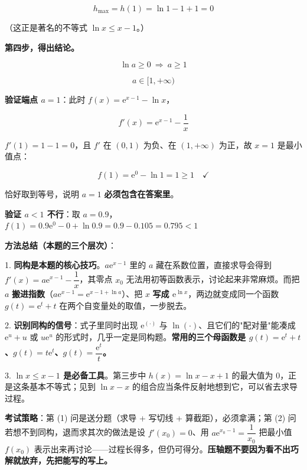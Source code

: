 \[h_{\max}=h(1)=\ln1-1+1=0\]

（这正是著名的不等式 $\ln x\le x-1$。）

\textbf{第四步，得出结论。}

\[\ln a\ge0\ \Longrightarrow\ a\ge1\]

\[\boxed{a\in[1,+\infty)}\]

\textbf{验证端点 $a=1$}：此时 $f(x)=\mathrm e^{x-1}-\ln x$，

\[f'(x)=\mathrm e^{x-1}-\frac1x\]

$f'(1)=1-1=0$，且 $f'$ 在 $(0,1)$ 为负、在 $(1,+\infty)$ 为正，故 $x=1$ 是最小值点：

\[f(1)=\mathrm e^{0}-\ln1=1\ge1\quad\checkmark\]

恰好取到等号，说明 $a=1$ \textbf{必须包含在答案里}。

\textbf{验证 $a<1$ 不行}：取 $a=0.9$，$f(1)=0.9\mathrm e^{0}-0+\ln0.9=0.9-0.105=0.795<1$ 

\par\medskip

\begin{gktip}
\textbf{方法总结（本题的三个层次）}：

1. \textbf{同构是本题的核心技巧}。$a\mathrm e^{x-1}$ 里的 $a$ 藏在系数位置，直接求导会得到 $f'(x)=a\mathrm e^{x-1}-\dfrac1x$，其零点 $x_0$ 无法用初等函数表示，讨论起来非常麻烦。而把 $a$ \textbf{搬进指数}（$a\mathrm e^{x-1}=\mathrm e^{x-1+\ln a}$）、把 $x$ \textbf{写成 $\mathrm e^{\ln x}$}，两边就变成同一个函数 $g(t)=\mathrm e^{t}+t$ 在两个自变量处的取值，一步脱去。

2. \textbf{识别同构的信号}：式子里同时出现 $\mathrm e^{(\cdot)}$ 与 $\ln(\cdot)$、且它们的"配对量"能凑成 $\mathrm e^{u}+u$ 或 $u\mathrm e^{u}$ 的形式时，几乎一定是同构题。\textbf{常用的三个母函数是 $g(t)=\mathrm e^{t}+t$、$g(t)=t\mathrm e^{t}$、$g(t)=\dfrac{\mathrm e^{t}}t$。}

3. \textbf{$\ln x\le x-1$ 是必备工具}。第三步中 $h(x)=\ln x-x+1$ 的最大值为 $0$，正是这条基本不等式；见到 $\ln x-x$ 的组合应当条件反射地想到它，可以省去求导过程。

\textbf{考试策略}：第 (1) 问是送分题（求导 + 写切线 + 算截距），必须拿满；第 (2) 问若想不到同构，退而求其次的做法是设 $f'(x_0)=0$、用 $a\mathrm e^{x_0-1}=\dfrac1{x_0}$ 把最小值 $f\left(x_0\right)$ 表示出来再讨论——过程长得多，但仍可得分。\textbf{压轴题不要因为看不出巧解就放弃，先把能写的写上。}
\end{gktip}
